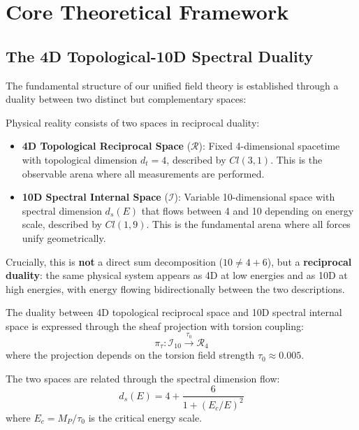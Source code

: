 \section{Core Theoretical Framework}
\label{sec:core}

\subsection{The 4D Topological-10D Spectral Duality}

The fundamental structure of our unified field theory is established through a duality between two distinct but complementary spaces:

\begin{insight}
Physical reality consists of two spaces in reciprocal duality:
\begin{itemize}
    \item \textbf{4D Topological Reciprocal Space} ($\mathcal{R}$): Fixed 4-dimensional spacetime with topological dimension $d_t = 4$, described by $Cl(3,1)$. This is the observable arena where all measurements are performed.
    
    \item \textbf{10D Spectral Internal Space} ($\mathcal{I}$): Variable 10-dimensional space with spectral dimension $d_s(E)$ that flows between 4 and 10 depending on energy scale, described by $Cl(1,9)$. This is the fundamental arena where all forces unify geometrically.
\end{itemize}

Crucially, this is \textbf{not} a direct sum decomposition ($10 \neq 4 + 6$), but a \textbf{reciprocal duality}: the same physical system appears as 4D at low energies and as 10D at high energies, with energy flowing bidirectionally between the two descriptions.
\end{insight}

\begin{definition}
The duality between 4D topological reciprocal space and 10D spectral internal space is expressed through the sheaf projection with torsion coupling:
\begin{equation}
    \pi_{\tau}: \mathcal{I}_{10} \xrightarrow{\tau_0} \mathcal{R}_{4}
\end{equation}
where the projection depends on the torsion field strength $\tau_0 \approx 0.005$.

The two spaces are related through the spectral dimension flow:
\begin{equation}
    d_s(E) = 4 + \frac{6}{1 + (E_c/E)^2}
\end{equation}
where $E_c = M_P/\tau_0$ is the critical energy scale.
\end{definition}

